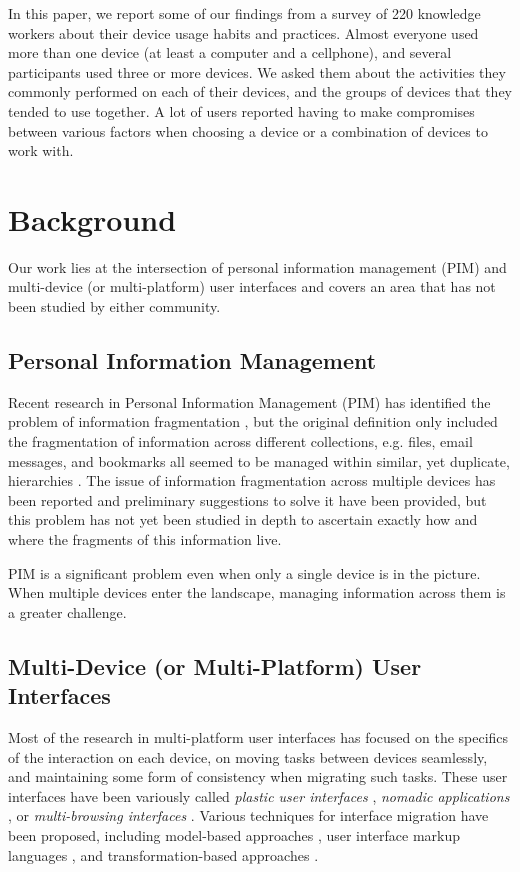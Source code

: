 \documentclass[twocolumn,final,10pt]{article}
\begin{document}
In this paper, we report some of our findings from a survey of 220 knowledge workers about their device usage habits and practices. Almost everyone used more than one device (at least a computer and a cellphone), and several participants used three or more devices. We asked them about the activities they commonly performed on each of their devices, and the groups of devices that they tended to use together. A lot of users reported having to make compromises between various factors when choosing a device or a combination of devices to work with.

\section{Background}

Our work lies at the intersection of personal information management (PIM) and multi-device (or multi-platform) user interfaces and covers an area that has not been studied by either community.

\subsection{Personal Information Management}

Recent research in Personal Information Management (PIM) has identified the problem of information fragmentation \cite{bergman_2006_the-project}, but the original definition only included the fragmentation of information across different collections, e.g. files, email messages, and bookmarks all seemed to be managed within similar, yet duplicate, hierarchies \cite{boardman_2003_too-many}. The issue of information fragmentation across multiple devices has been reported \cite{karger_2006_data} and preliminary suggestions to solve it have been provided, but this problem has not yet been studied in depth to ascertain exactly how and where the fragments of this information live.

PIM is a significant problem even when only a single device is in the picture. When multiple devices enter the landscape, managing information across them is a greater challenge.

\subsection{Multi-Device (or Multi-Platform) User Interfaces}

Most of the research in multi-platform user interfaces has focused on the specifics of the interaction on each device, on moving tasks between devices seamlessly, and maintaining some form of consistency when migrating such tasks. These user interfaces have been variously called \textit{plastic user interfaces} \cite{thevenin_1999_plasticity}, \textit{nomadic applications} \cite{mori_2003_tool}, or \textit{multi-browsing interfaces} \cite{johanson_2001_multibrowsing}. Various techniques for interface migration have been proposed, including model-based approaches \cite{mori_2003_tool, einsenstein_2001_applying}, user interface markup languages \cite{abrams_1999_uiml}, and transformation-based approaches \cite{richter_2005_transformation, florins_2004_graceful}.
\end{document}
